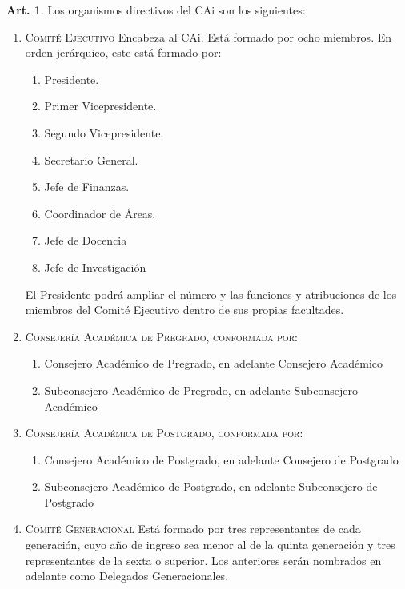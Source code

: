 \documentclass[letterpaper,11pt]{article}
\theoremstyle{definition}%
\newtheorem{art}{Art.} %
\begin{document}
\newpage

\begin{art}\label{organismosCAi}
	Los organismos directivos del CAi son los siguientes:
	\begin{enumerate}
		\item \label{jerarquia} \textsc{Comité Ejecutivo} Encabeza al CAi. Está formado por ocho miembros. En orden jerárquico, este está formado por:
		      \begin{enumerate}
			      \item Presidente.
			      \item Primer Vicepresidente.
			      \item Segundo Vicepresidente.
			      \item Secretario General.
			      \item Jefe de Finanzas.
			      \item Coordinador de Áreas.
			      \item Jefe de Docencia
			      \item Jefe de Investigación
		      \end{enumerate}
		      El Presidente podrá ampliar el número y las funciones y atribuciones de los miembros del Comité Ejecutivo dentro de sus propias facultades.

		\item \textsc{Consejería Académica de Pregrado, conformada por}:
		      \begin{enumerate}
			      \item Consejero Académico de Pregrado, en adelante Consejero Académico
			      \item Subconsejero Académico de Pregrado, en adelante Subconsejero Académico
		      \end{enumerate}

		\item \textsc{Consejería Académica de Postgrado, conformada por}:
		      \begin{enumerate}
			      \item Consejero Académico de Postgrado, en adelante Consejero de Postgrado
			      \item Subconsejero Académico de Postgrado, en adelante Subconsejero de Postgrado
		      \end{enumerate}

		\item \textsc{Comité Generacional} Está formado por tres representantes de cada generación, cuyo año de ingreso sea menor al de la quinta generación y tres representantes de la sexta o superior. Los anteriores serán nombrados en adelante como Delegados Generacionales.


\end{enumerate}
\end{art}
\end{document}
